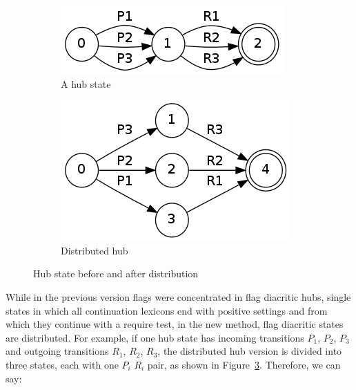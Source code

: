 \documentclass[11pt]{article}
\begin{document}
\begin{figure}[h]
\centering
\begin{subfigure}[b]{0.4\textwidth}
        \includegraphics[width=\textwidth]{hub.png}
        \caption{A hub state}
        \label{fig:hub}
\end{subfigure}%
\quad %
\begin{subfigure}[b]{0.4\textwidth}
        \includegraphics[width=\textwidth]{distr.png}
        \caption{Distributed hub}
        \label{fig:distr}
\end{subfigure}
\caption{Hub state before and after distribution}
\label{fig:hub_distr}
\end{figure}

While in the previous version flags were concentrated in flag diacritic hubs, single states in which all continuation lexicons end with positive settings and from which they continue with a require test, in the new method, flag diacritic states are distributed. For example, if one hub state has incoming transitions 
$P_1$, $P_2$, $P_3$ and outgoing transitions $R_1$, $R_2$, $R_3$, the distributed hub version is divided into three states, each with one 
$P_i$ $R_i$ pair, as shown in 
Figure~\ref{fig:hub_distr}. Therefore, we can say:
\end{document}
